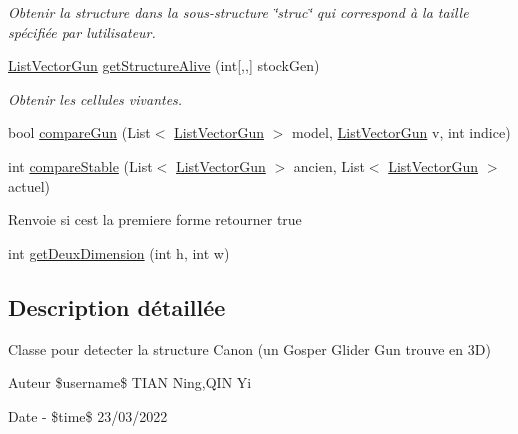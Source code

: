 \begin{DoxyCompactItemize}
\begin{DoxyCompactList}\small\item\em Obtenir la structure dans la sous-\/structure \char`\"{}struc\char`\"{} qui correspond à la taille spécifiée par l\textquotesingle{}utilisateur. \end{DoxyCompactList}\item 
\mbox{\hyperlink{class_list_vector_gun}{List\+Vector\+Gun}} \mbox{\hyperlink{class_detection_gun_a488d963e0b78922904b6bd42182ca7b1}{get\+Structure\+Alive}} (int\mbox{[},,\mbox{]} stock\+Gen)
\begin{DoxyCompactList}\small\item\em Obtenir les cellules vivantes. \end{DoxyCompactList}\item 
bool \mbox{\hyperlink{class_detection_gun_a0ca849e6a37b8734261999c4f8f64523}{compare\+Gun}} (List$<$ \mbox{\hyperlink{class_list_vector_gun}{List\+Vector\+Gun}} $>$ model, \mbox{\hyperlink{class_list_vector_gun}{List\+Vector\+Gun}} v, int indice)
\item 
int \mbox{\hyperlink{class_detection_gun_af0283c67f8fe041c2ff8ded541054d56}{compare\+Stable}} (List$<$ \mbox{\hyperlink{class_list_vector_gun}{List\+Vector\+Gun}} $>$ ancien, List$<$ \mbox{\hyperlink{class_list_vector_gun}{List\+Vector\+Gun}} $>$ actuel)
\begin{DoxyCompactList}\small\item\em \begin{DoxyReturn}{Renvoie}
si c\textquotesingle{}est la premiere forme retourner true 
\end{DoxyReturn}
\end{DoxyCompactList}\item 
int \mbox{\hyperlink{class_detection_gun_a2bd76f00286c4916cc9e525e9e4403bb}{get\+Deux\+Dimension}} (int h, int w)
\end{DoxyCompactItemize}


\subsection{Description détaillée}
Classe pour detecter la structure Canon (un Gosper Glider Gun trouve en 3D) \begin{DoxyAuthor}{Auteur}
\$username\$ T\+I\+AN Ning,Q\+IN Yi 
\end{DoxyAuthor}
\begin{DoxyDate}{Date}
-\/ \$time\$ 23/03/2022 
\end{DoxyDate}



